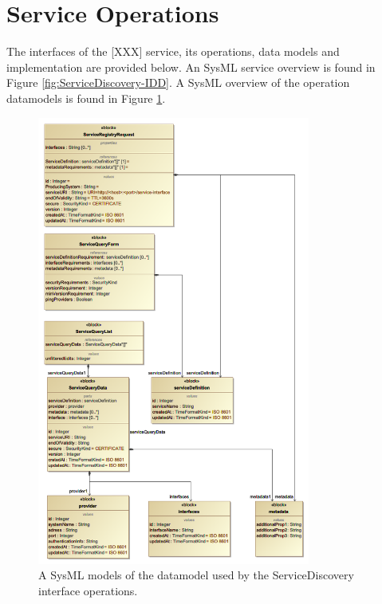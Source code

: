 \documentclass[a4paper]{arrowhead}
\begin{document}
\section{Service Operations}
\label{sec:operations}

The interfaces of the [XXX] service, its operations, data models and
implementation are provided below. An SysML service overview is found in Figure \ref{fig:ServiceDiscovery-IDD}. A SysML overview of the operation datamodels is found in Figure \ref{fig:ServiceDiscovery-datamodels}.

\begin{figure}[ht!]
  \centering
  \includegraphics[width=0.8\textwidth]{figures/ServiceDiscovery-datamodels}
  \caption{A SysML models of the datamodel used by the
    ServiceDiscovery interface operations. }
  \label{fig:ServiceDiscovery-datamodels}
\end{figure}
\end{document}
